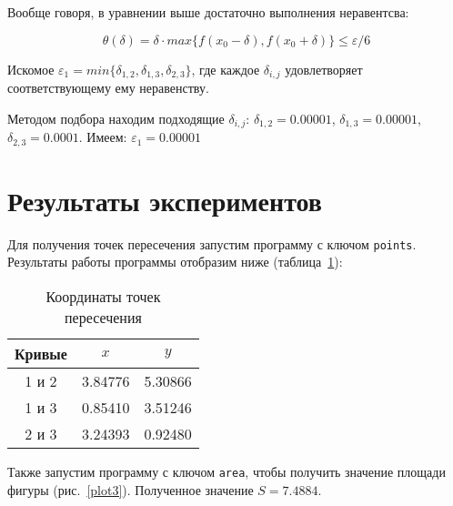 \documentclass[a4paper,12pt,titlepage,finall]{article}
\begin{document}
Вообще говоря, в уравнении выше достаточно выполнения неравентсва:

 $$\theta(\delta)= \delta \cdot max\{f(x_0-\delta), f(x_0+\delta)\} \leq \varepsilon/6$$

Искомое $\varepsilon_1 = min\{ \delta_{1,2}, \delta_{1,3}, \delta_{2,3}\}$, где каждое $\delta_{i,j}$ удовлетворяет соответствующему ему неравенству. 

Методом подбора находим подходящие $\delta_{i,j}$: $\delta_{1,2} = 0.00001$, $\delta_{1,3} = 0.00001$, $\delta_{2,3} = 0.0001$. Имеем: $\varepsilon_1 = 0.00001$


\newpage

\section{Результаты экспериментов}

Для получения точек пересечения запустим программу с ключом \texttt{points}. Результаты работы программы отобразим ниже (таблица~\ref{table1}):

\begin{table}[h]
\centering
\begin{tabular}{|c|c|c|}
\hline
Кривые & $x$ & $y$ \\
\hline
1 и 2 &  3.84776 & 5.30866 \\
1 и 3 &  0.85410 & 3.51246 \\
2 и 3 &  3.24393 & 0.92480 \\
\hline
\end{tabular}
\caption{Координаты точек пересечения}
\label{table1}
\end{table}


Также запустим программу с ключом \texttt{area}, чтобы получить значение площади фигуры (рис.~\ref{plot3}). Полученное значение $S=7.4884$.
\end{document}
